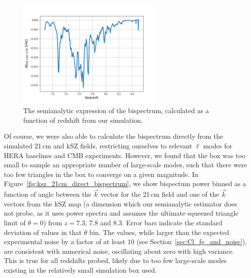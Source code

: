\begin{figure}
\centering
\includegraphics[width=0.65\textwidth]{chapters/ksz_21cm/figures/semianalytic_bispec_vs_z.png}
\caption{The semianalytic expression of the bispectrum, calculated as a function of redshift from our simulation.}
\label{fig:ksz_21cm_semianalytic_result}
\end{figure}

Of course, we were also able to calculate the bispectrum directly from the simulated 21\,cm and kSZ fields, restricting ourselves to relevant $\ell$ modes for HERA baselines and CMB experiments. However, we found that the box was too small to sample an appropriate number of large-scale modes, such that there were too few triangles in the box to converge on a given magnitude. In Figure~\ref{fig:ksz_21cm_direct_bispectrum}, we show bispectum power binned as a function of angle between the $\vec{k}$ vector for the 21\,cm field and one of the $\vec{k}$ vectors from the kSZ map (a dimension which our semianalytic estimator does not probe, as it uses power spectra and assumes the ultimate squeezed triangle limit of $\theta = 0$) from $z=7.3$, 7.8 and 8.3. Error bars indicate the standard deviation of values in that $\theta$ bin. The values, while larger than the expected experimental noise by a factor of at least $10$ (see Section~\ref{sec:Cl_fg_and_noise}), are consistent with numerical noise, oscillating about zero with high variance. This is true for all redshifts probed, likely due to too few large-scale modes existing in the relatively small simulation box used.

